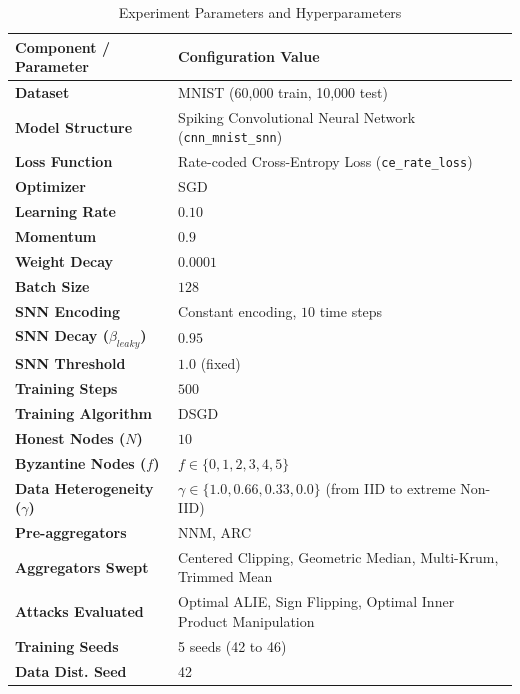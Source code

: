 \documentclass{article}
\begin{document}
\begin{table}[htbp]
    \centering
    \caption{Experiment Parameters and Hyperparameters}
    \label{tab:params}
    \begin{tabular}{ll}
        \toprule
        \textbf{Component / Parameter} & \textbf{Configuration Value} \\
        \midrule
        \textbf{Dataset} & MNIST (60,000 train, 10,000 test) \\
        \textbf{Model Structure} & Spiking Convolutional Neural Network (\texttt{cnn\_mnist\_snn}) \\
        \textbf{Loss Function} & Rate-coded Cross-Entropy Loss (\texttt{ce\_rate\_loss}) \\
        \textbf{Optimizer} & SGD \\
        \textbf{Learning Rate} & $0.10$ \\
        \textbf{Momentum} & $0.9$ \\
        \textbf{Weight Decay} & $0.0001$ \\
        \textbf{Batch Size} & $128$ \\
        \textbf{SNN Encoding} & Constant encoding, $10$ time steps \\
        \textbf{SNN Decay ($\beta_{leaky}$)} & $0.95$ \\
        \textbf{SNN Threshold} & $1.0$ (fixed) \\
        \textbf{Training Steps} & $500$ \\
        \textbf{Training Algorithm} & DSGD \\
        \textbf{Honest Nodes ($N$)} & $10$ \\
        \textbf{Byzantine Nodes ($f$)} & $f \in \{0, 1, 2, 3, 4, 5\}$ \\
        \textbf{Data Heterogeneity ($\gamma$)} & $\gamma \in \{1.0, 0.66, 0.33, 0.0\}$ (from IID to extreme Non-IID) \\
        \textbf{Pre-aggregators} & NNM, ARC \\
        \textbf{Aggregators Swept} & Centered Clipping, Geometric Median, Multi-Krum, Trimmed Mean \\
        \textbf{Attacks Evaluated} & Optimal ALIE, Sign Flipping, Optimal Inner Product Manipulation \\
        \textbf{Training Seeds} & 5 seeds (42 to 46) \\
        \textbf{Data Dist. Seed} & 42 \\
        \bottomrule
    \end{tabular}
\end{table}
\end{document}
